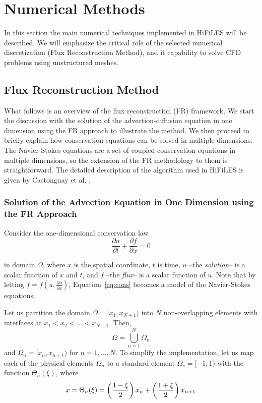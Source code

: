 
\section{Numerical Methods}
\label{sec:numerics}

In this section the main numerical techniques implemented in HiFiLES will be described. We will emphasize the critical role of the selected numerical discretization (Flux Reconstruction Method), and it capability to solve CFD problems using unstructured meshes. 

\subsection{Flux Reconstruction Method}

What follows is an overview of the flux reconstruction (FR) framework. We start the discussion with the solution of the advection-diffusion equation in one dimension using the FR approach to illustrate the method. We then proceed to briefly explain how conservation equations can be solved in multiple dimensions. The Navier-Stokes equations are a set of coupled conservation equations in multiple dimensions, so the extension of the FR methodology to them is straightforward. The detailed description of the algorithm used in HiFiLES is given by Castonguay et al. \cite{castonguay2011}.

\subsubsection{Solution of the Advection Equation in One Dimension using the FR Approach}

Consider the one-dimensional conservation law
\begin{equation}
\label{eq:cons}
\frac{\partial u}{\partial t} + \frac{\partial f}{\partial x} = 0
\end{equation}

in domain $\Omega$, where $x$ is the spatial coordinate, $t$ is time, $u$ --the \emph{solution}-- is a scalar function of $x$ and $t$, and $f$ --the \emph{flux}-- is a scalar function of $u$. Note that by letting $f = f(u,\frac{\partial u}{\partial x})$, Equation~\ref{eq:cons} becomes a model of the Navier-Stokes equations.

Let us partition the domain $\Omega = [x_1,x_{N+1})$ into $N$ non-overlapping elements with 
interfaces at $x_1<x_2<...<x_{N+1}$. Then,
\begin{equation}
\Omega = \bigcup^N_{n=1} \Omega_n
\end{equation}
and $\Omega_n = [x_n,x_{n+1})$ for $n = 1,...,N$. To simplify the implementation, let us map each of the physical elements $\Omega_n$ to a standard element $\Omega_s=[-1,1)$ with the function $\Theta_n(\xi)$, where
\begin{equation}
x = \Theta_n(\xi) = \left( \frac{1-\xi}{2} \right) x_n + \left(\frac{1+\xi}{2}\right) x_{n+1} 
\end{equation}

